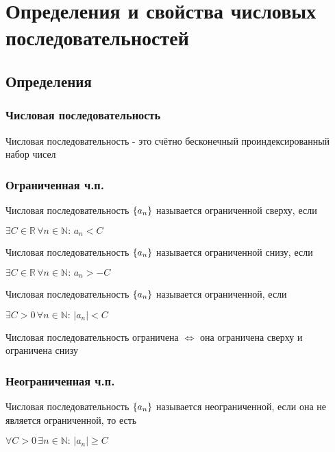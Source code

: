 \chapter{Определения и свойства числовых последовательностей}

\section{Определения}

\subsection{Числовая последовательность}

{
    Числовая последовательность - это счётно бесконечный проиндексированный набор чисел
}

\subsection{Ограниченная ч.п.}

{
    Числовая последовательность $ \{ a_n \} $ называется ограниченной сверху, если

    $ \exists C \in \mathbb{R} \, \forall n \in \mathbb{N}: \, a_n < C $
}

{
    Числовая последовательность $ \{ a_n \} $ называется ограниченной снизу, если

    $ \exists C \in \mathbb{R} \, \forall n \in \mathbb{N}: \, a_n > -C $
}

{
    Числовая последовательность $ \{ a_n \} $ называется ограниченной, если

    $ \exists C > 0 \, \forall n \in \mathbb{N}: \, | a_n | < C $
}

\nt
{
    Числовая последовательность ограничена $ \iff $ она ограничена сверху и ограничена снизу
}

\subsection{Неограниченная ч.п.}

{
    Числовая последовательность $ \{ a_n \} $ называется неограниченной, если она не является ограниченной, то есть

    $ \forall C > 0 \, \exists n \in \mathbb{N}: \, | a_n | \ge C $
}

